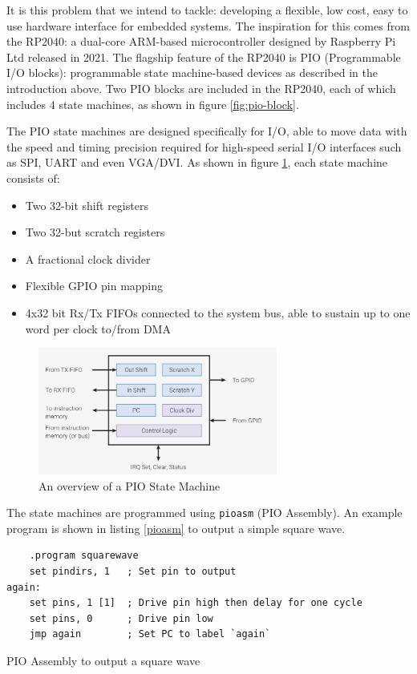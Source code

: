 \documentclass[a4paper,fleqn,12pt]{article}
\begin{document}
It is this problem that we intend to tackle: developing a flexible, low cost, easy to use hardware interface for embedded systems. The inspiration for this comes from the RP2040: a dual-core ARM-based microcontroller designed by Raspberry Pi Ltd released in 2021. The flagship feature of the RP2040 is PIO (Programmable I/O blocks): programmable state machine-based devices as described in the introduction above. Two PIO blocks are included in the RP2040, each of which includes 4 state machines, as shown in figure \ref{fig:pio-block}.

The PIO state machines are designed specifically for I/O, able to move data with the speed and timing precision required for high-speed serial I/O interfaces such as SPI, UART and even VGA/DVI. As shown in figure \ref{fig:pio-sm}, each state machine consists of:

\begin{itemize}
	\item Two 32-bit shift registers
	\item Two 32-but scratch registers
	\item A fractional clock divider
	\item Flexible GPIO pin mapping
	\item 4x32 bit Rx/Tx FIFOs connected to the system bus, able to sustain up to one word per clock to/from DMA
\end{itemize}

\begin{figure}[H]
	\centering
	\includegraphics[width=0.7\textwidth]{../img/rp2040-state-machine.png}
	\caption{An overview of a PIO State Machine \citep{rp2040}}
	\label{fig:pio-sm}
\end{figure}

The state machines are programmed using \texttt{pioasm} (PIO Assembly). An example program is shown in listing \ref{pioasm} to output a simple square wave.

\begin{listing}[b]
	\vspace{0.5cm}
	\begin{verbatim}
    .program squarewave
    set pindirs, 1   ; Set pin to output
again:
    set pins, 1 [1]  ; Drive pin high then delay for one cycle
    set pins, 0      ; Drive pin low
    jmp again        ; Set PC to label `again`
    \end{verbatim}
	\caption{PIO Assembly to output a square wave \citep{rp2040}}
	\label{pioasm}
\end{listing}
\end{document}
